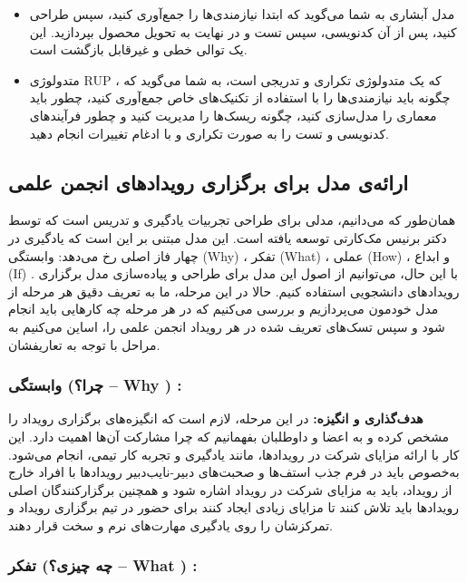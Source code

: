\begin{itemize}
	\item مدل آبشاری به شما می‌گوید که ابتدا نیازمندی‌ها را جمع‌آوری کنید، سپس طراحی کنید، پس از آن کدنویسی، سپس تست و در نهایت به تحویل محصول بپردازید. این یک توالی خطی و غیرقابل بازگشت است.
	\item متدولوژی RUP ، که یک متدولوژی تکراری و تدریجی است، به شما می‌گوید که چگونه باید نیازمندی‌ها را با استفاده از تکنیک‌های خاص جمع‌آوری کنید، چطور باید معماری را مدل‌سازی کنید، چگونه ریسک‌ها را مدیریت کنید و چطور فرآیندهای کدنویسی و تست را به صورت تکراری و با ادغام تغییرات انجام دهید.
\end{itemize}

\subsection*{ارائه‌ی مدل برای برگزاری رویدادهای انجمن علمی}

همان‌طور که می‌دانیم،
مدلی برای طراحی تجربیات یادگیری و تدریس است که توسط دکتر برنیس مک‌کارتی توسعه یافته است. این مدل مبتنی بر این است که یادگیری در چهار فاز اصلی رخ می‌دهد: وابستگی (Why) ، تفکر (What) ، عملی (How) ، و ابداع (If) . با این حال، می‌توانیم از اصول این مدل برای طراحی و پیاده‌سازی مدل برگزاری رویدادهای دانشجویی استفاده کنیم. حالا در این مرحله، ما به تعریف دقیق هر مرحله از مدل خودمون می‌پردازیم و بررسی می‌کنیم که در هر مرحله چه کارهایی باید انجام شود و سپس تسک‌های تعریف شده در هر رویداد انجمن علمی را، اساین می‌کنیم به مراحل با توجه به تعاریفشان.

\subsubsection*{وابستگی (چرا؟ – Why ) :}

\textbf{هدف‌گذاری و انگیزه:}
در این مرحله، لازم است که انگیزه‌های برگزاری رویداد را مشخص کرده و به اعضا و داوطلبان بفهمانیم که چرا مشارکت آن‌ها اهمیت دارد. این کار با ارائه مزایای شرکت در رویدادها، مانند یادگیری و تجربه کار تیمی، انجام می‌شود. به‌خصوص باید در فرم جذب استف‌ها و صحبت‌های دبیر-نایب‌دبیر رویدادها با افراد خارج از رویداد، باید به مزایای شرکت در رویداد اشاره شود و همچنین برگزارکنندگان اصلی رویدادها باید تلاش کنند تا مزایای زیادی ایجاد کنند برای حضور در تیم برگزاری رویداد و تمرکزشان را روی یادگیری مهارت‌های نرم و سخت قرار دهند.

\subsubsection*{تفکر (چه چیزی؟ – What ) :}

